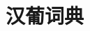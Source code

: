 \documentclass[a4paper,12pt,twoside,openany]{memoir}
\DeclareRobustCommand{\&}{%
    \ifdim\fontdimen1\font>0pt
        \textsl{\symbol{`\&}}%
    \else
        \symbol{`\&}%
    \fi
}
\begin{document}
\chapter{汉葡词典}


%
%
%
%
%
%
%
%
%
%
\end{document}

